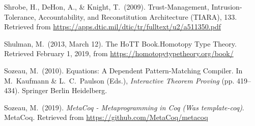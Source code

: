\documentclass[12pt,twoside]{article}
\begin{document}
{\begin{thebibliography}{222}
Shrobe, H., DeHon, A., \& Knight, T.~(2009). Trust-Management, Intrusion-Tolerance, Accountability, and Reconstitution Architecture (TIARA), 133. Retrieved from \href{https://apps.dtic.mil/dtic/tr/fulltext/u2/a511350.pdf}{{\ttfamily https://\hspace{0pt}apps.\hspace{0pt}dtic.\hspace{0pt}mil/\hspace{0pt}dtic/\hspace{0pt}tr/\hspace{0pt}fulltext/\hspace{0pt}u2/\hspace{0pt}a511350.\hspace{0pt}pdf}}\label{shrobe_trust-management_2009}%

\mdbibitemlabel{[Shulman, 2013]}Shulman, M.~(2013, March 12). The HoTT Book.Homotopy Type Theory. Retrieved February 1, 2019, from \href{https://homotopytypetheory.org/book/}{{\ttfamily https://\hspace{0pt}homotopytypetheory.\hspace{0pt}org/\hspace{0pt}book/\hspace{0pt}}}\label{shulman_hott_2013}%

\mdbibitemlabel{[Sozeau, 2010]}Sozeau, M.~(2010). Equations: A Dependent Pattern-Matching Compiler. In M.~Kaufmann \& L.~C.~Paulson (Eds.), \emph{Interactive Theorem Proving} (pp. 419–434). Springer Berlin Heidelberg.\label{sozeau_equations:_2010}%

\mdbibitemlabel{[Sozeau, 2019]}Sozeau, M.~(2019). \emph{MetaCoq - Metaprogramming in Coq (Was template-coq)}. MetaCoq. Retrieved from \href{https://github.com/MetaCoq/metacoq}{{\ttfamily https://\hspace{0pt}github.\hspace{0pt}com/\hspace{0pt}MetaCoq/\hspace{0pt}metacoq}}\label{sozeau_metacoq_2019}%


\end{thebibliography}}
\end{document}
